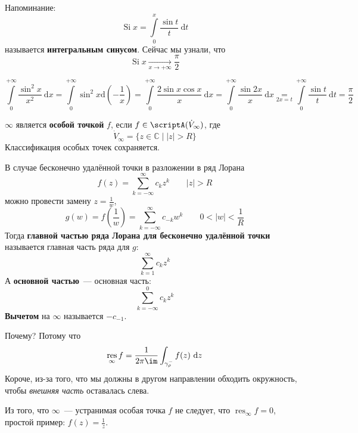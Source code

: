 \documentclass{article}
\begin{document}
    \begin{remark}
        Напоминание:
        $$
        \operatorname{Si}x=\int\limits_0^x\frac{\sin t}t~\mathrm dt
        $$
        называется \textbf{интегральным синусом}. Сейчас мы узнали, что
        $$
        \operatorname{Si}x\underset{x\to+\infty}\longrightarrow\frac\pi2
        $$
    \end{remark}
    \begin{example}
        $$
        \int\limits_0^{+\infty}\frac{\sin^2x}{x^2}~\mathrm dx=\int\limits_0^{+\infty}\sin^2x\mathrm d\left(-\frac1x\right)=\int\limits_0^{+\infty}\frac{2\sin x\cos x}x~\mathrm dx=\int\limits_0^{+\infty}\frac{\sin 2x}x~\mathrm dx\underset{2x=t}=\int\limits_0^{+\infty}\frac{\sin t}t~\mathrm dt=\frac\pi2
        $$
    \end{example}
    \begin{definition}
        $\infty$ является \textbf{особой точкой} $f$, если $f\in\scriptA(\dot V_\infty)$, где
        $$
        \dot V_\infty=\{z\in\mathbb C\mid |z|>R\}
        $$
        Классификация особых точек сохраняется.
    \end{definition}
    \begin{definition}
        В случае бесконечно удалённой точки в разложении в ряд Лорана
        $$
        f(z)=\sum\limits_{k=-\infty}^\infty c_kz^k\qquad |z|>R
        $$
        можно провести замену $z=\frac1w$,
        $$
        g(w)=f\left(\frac1w\right)=\sum\limits_{k=-\infty}^\infty c_{-k}w^k\qquad0<|w|<\frac1R
        $$
        Тогда \textbf{главной частью ряда Лорана для бесконечно удалённой точки} называется главная часть ряда для $g$:
        $$
        \sum\limits_{k=1}^\infty c_kz^k
        $$
        А \textbf{основной частью}~--- основная часть:
        $$
        \sum\limits_{k=-\infty}^0 c_kz^k
        $$
        \textbf{Вычетом} на $\infty$ называется $-c_{-1}$.
    \end{definition}
    \begin{remark}
        Почему? Потому что
        $$
        \operatorname*{res}_\infty f=\frac1{2\pi\im}\int_{\gamma_\rho^-}f(z)~\mathrm dz
        $$
        Короче, из-за того, что мы должны в другом направлении обходить окружность, чтобы \textit{внешняя часть} оставалась слева.
    \end{remark}
    \begin{remark}
        Из того, что $\infty$~--- устранимая особая точка $f$ не следует, что $\operatorname*{res}_\infty f=0$, простой пример: $f(z)=\frac1z$.
    \end{remark}
\end{document}
